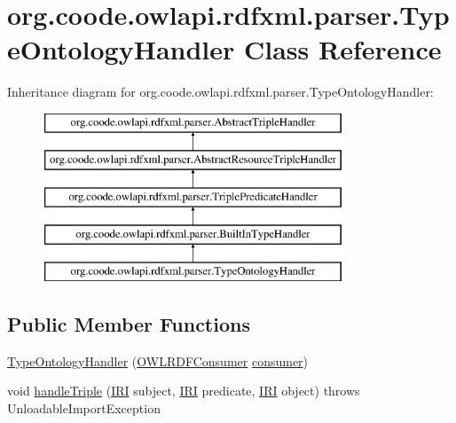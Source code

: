 \hypertarget{classorg_1_1coode_1_1owlapi_1_1rdfxml_1_1parser_1_1_type_ontology_handler}{\section{org.\-coode.\-owlapi.\-rdfxml.\-parser.\-Type\-Ontology\-Handler Class Reference}
\label{classorg_1_1coode_1_1owlapi_1_1rdfxml_1_1parser_1_1_type_ontology_handler}
}
Inheritance diagram for org.\-coode.\-owlapi.\-rdfxml.\-parser.\-Type\-Ontology\-Handler\-:\begin{figure}[H]
\begin{center}
\leavevmode
\includegraphics[height=5.000000cm]{classorg_1_1coode_1_1owlapi_1_1rdfxml_1_1parser_1_1_type_ontology_handler}
\end{center}
\end{figure}
\subsection*{Public Member Functions}
\begin{DoxyCompactItemize}
\item 
\hyperlink{classorg_1_1coode_1_1owlapi_1_1rdfxml_1_1parser_1_1_type_ontology_handler_abd544be11879cc73cd76d7ca0c255e60}{Type\-Ontology\-Handler} (\hyperlink{classorg_1_1coode_1_1owlapi_1_1rdfxml_1_1parser_1_1_o_w_l_r_d_f_consumer}{O\-W\-L\-R\-D\-F\-Consumer} \hyperlink{classorg_1_1coode_1_1owlapi_1_1rdfxml_1_1parser_1_1_abstract_triple_handler_a4ccf4d898ff01eb1cadfa04b23d54e9c}{consumer})
\item 
void \hyperlink{classorg_1_1coode_1_1owlapi_1_1rdfxml_1_1parser_1_1_type_ontology_handler_a556bc44fc0379ba44b75cd6d09e232ee}{handle\-Triple} (\hyperlink{classorg_1_1semanticweb_1_1owlapi_1_1model_1_1_i_r_i}{I\-R\-I} subject, \hyperlink{classorg_1_1semanticweb_1_1owlapi_1_1model_1_1_i_r_i}{I\-R\-I} predicate, \hyperlink{classorg_1_1semanticweb_1_1owlapi_1_1model_1_1_i_r_i}{I\-R\-I} object)  throws Unloadable\-Import\-Exception 
\end{DoxyCompactItemize}
